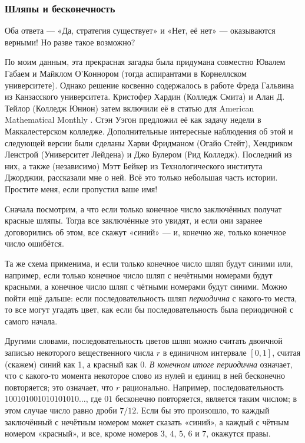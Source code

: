 \subsubsection*{Шляпы и бесконечность}

Оба ответа --- «Да, стратегия существует» и «Нет, её нет» --- оказываются верными!
Но разве такое возможно?

По моим данным, эта прекрасная загадка была придумана совместно Ювалем Габаем и Майклом О'Коннором (тогда аспирантами в Корнеллском университете).
Однако решение косвенно содержалось в работе Фреда Гальвина из Канзасского университета.
Кристофер Хардин (Колледж Смита) и Алан Д. Тейлор (Колледж Юнион) затем включили её в статью для American Mathematical Monthly \cite{36}.
Стэн Уэгон предложил её как задачу недели в Маккалестерском колледже.
Дополнительные интересные наблюдения об этой и следующей версии были сделаны Харви Фридманом (Огайо Стейт), Хендриком Ленстрой (Университет Лейдена) и Джо Булером (Рид Колледж).
Последний из них, а также (независимо) Мэтт Бейкер из Технологического института Джорджии, рассказали мне о ней.
Всё это только небольшая часть истории.
Простите меня, если пропустил ваше имя!

Сначала посмотрим, а что если только конечное число заключённых получат красные шляпы.
Тогда все заключённые это увидят, и если они заранее договорились об этом, все скажут «синий» --- и, конечно же, только конечное число ошибётся.

Та же схема применима, и если только конечное число шляп будут синими или, например, если только конечное число шляп с нечётными номерами будут красными, а конечное число шляп с чётными номерами будут синими.
Можно пойти ещё дальше: если последовательность шляп \emph{периодична} с какого-то места, то все могут угадать цвет, как если бы последовательность была периодичной с самого начала.

Другими словами, последовательность цветов шляп можно считать двоичной записью некоторого вещественного числа $r$ в единичном интервале $[0,1]$, считая (скажем) синий как 1, а красный как 0.
\emph{В конечном итоге периодична} означает, что с какого-то момента некоторое слово из нулей и единиц в ней бесконечно повторяется;
это означает, что $r$ рационально.
Например, последовательность $100101001010101010\dots$, где $01$ бесконечно повторяется, является таким числом; в этом случае число равно дроби $7/12$.
Если бы это произошло, то каждый заключённый с нечётным номером может сказать «синий», а каждый с чётным номером «красный», и все, кроме номеров $3$, $4$, $5$, $6$ и $7$, окажутся правы.


